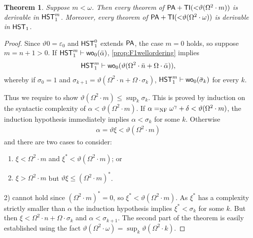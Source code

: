 \documentclass[UKenglish,cleveref,DIV=12]{scrartcl}
\newtheorem{theorem}{Theorem}[section]
\newtheorem{corollary}[lemma]{Corollary}
\theoremstyle{definition}
\theoremstyle{definition}
\begin{document}
\begin{theorem}\label{cor:F1lowerbound}\label{thm:F1lowerbound}
Suppose $m<\omega$. Then every theorem of
$\mathsf{PA}+\mathsf{TI}(\mathord<\vartheta(\Omega^2\cdot m))$  is derivable in
$\mathsf{HST}_1^{m}$. Moreover, every theorem of
$\mathsf{PA}+\mathsf{TI}(\mathord<\vartheta(\Omega^2\cdot \omega))$ is derivable in
$\mathsf{HST}_1$.
\end{theorem}
\begin{proof}
Since $\vartheta0=\varepsilon_0$ and $\mathsf{HST}_1^0$ extends $\mathsf{PA}$, the case
$m=0$ holds, so suppose $m=n+1>0$. If $\mathsf{HST}_1^m\vdash \mathsf{wo}_0(\bar\alpha)$,
\cref{prop:F1wellordering} implies
\begin{align*}
 \mathsf{HST}_1^{m}\vdash \mathsf{wo}_0 (\vartheta(\Omega^2\cdot \bar n+\Omega\cdot\bar\alpha)),
\end{align*}
whereby if $\sigma_0=1$ and $\sigma_{k+1}=\vartheta(\Omega^2\cdot n+\Omega\cdot\sigma_k)$, $\mathsf{HST}_1^m\vdash \mathsf{wo}_0(\bar\sigma_k)$ for every $k$.

Thus we require to show $\vartheta(\Omega^2\cdot m)\le\sup_k\sigma_k$. This
is proved by induction on the syntactic complexity of $\alpha<\vartheta(\Omega^2\cdot
m)$. If $\alpha=_{\mathrm{NF}}\omega^\gamma+\delta<\vartheta(\Omega^2\cdot m)$, the induction
hypothesis immediately implies $\alpha<\sigma_k$ for some $k$. Otherwise
\begin{align*}
 \alpha=\vartheta\xi<\vartheta(\Omega^2\cdot m)
\end{align*}
and there are two cases to consider:
\begin{enumerate}%
 \item $\xi<\Omega^2\cdot m$ and $\xi^*<\vartheta(\Omega^2\cdot m)$; or
 \item $\xi>\Omega^2\cdot m$ but $\vartheta\xi\le(\Omega^2\cdot m)^*$.
\end{enumerate}
2) cannot hold since $(\Omega^2\cdot m)^*=0$, so $\xi^*<\vartheta(\Omega^2\cdot m)$. As $\xi^*$ has a complexity strictly
smaller than $\alpha$ the induction hypothesis
implies $\xi^*<\sigma_k$ for some $k$. But then $\xi<\Omega^2\cdot n+\Omega\cdot\sigma_k$ and
$\alpha<\sigma_{k+1}$.
%
The second part of the theorem is easily established using the fact $\vartheta(\Omega^2\cdot\omega)=\sup_k\vartheta(\Omega^2\cdot k)$.
\end{proof}
\end{document}
